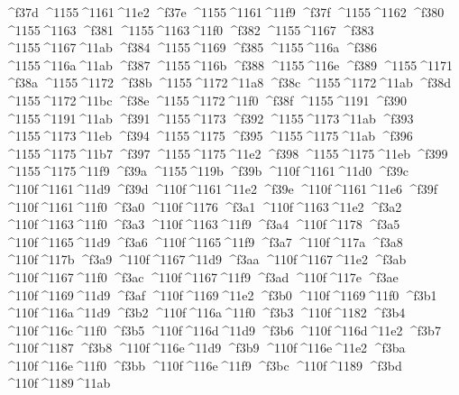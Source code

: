 \checkit ^^^^f37d ^^^^1155^^^^1161^^^^11e2
\checkit ^^^^f37e ^^^^1155^^^^1161^^^^11f9
\checkit ^^^^f37f ^^^^1155^^^^1162
\checkit ^^^^f380 ^^^^1155^^^^1163
\checkit ^^^^f381 ^^^^1155^^^^1163^^^^11f0
\checkit ^^^^f382 ^^^^1155^^^^1167
\checkit ^^^^f383 ^^^^1155^^^^1167^^^^11ab
\checkit ^^^^f384 ^^^^1155^^^^1169
\checkit ^^^^f385 ^^^^1155^^^^116a
\checkit ^^^^f386 ^^^^1155^^^^116a^^^^11ab
\checkit ^^^^f387 ^^^^1155^^^^116b
\checkit ^^^^f388 ^^^^1155^^^^116e
\checkit ^^^^f389 ^^^^1155^^^^1171
\checkit ^^^^f38a ^^^^1155^^^^1172
\checkit ^^^^f38b ^^^^1155^^^^1172^^^^11a8
\checkit ^^^^f38c ^^^^1155^^^^1172^^^^11ab
\checkit ^^^^f38d ^^^^1155^^^^1172^^^^11bc
\checkit ^^^^f38e ^^^^1155^^^^1172^^^^11f0
\checkit ^^^^f38f ^^^^1155^^^^1191
\checkit ^^^^f390 ^^^^1155^^^^1191^^^^11ab
\checkit ^^^^f391 ^^^^1155^^^^1173
\checkit ^^^^f392 ^^^^1155^^^^1173^^^^11ab
\checkit ^^^^f393 ^^^^1155^^^^1173^^^^11eb
\checkit ^^^^f394 ^^^^1155^^^^1175
\checkit ^^^^f395 ^^^^1155^^^^1175^^^^11ab
\checkit ^^^^f396 ^^^^1155^^^^1175^^^^11b7
\checkit ^^^^f397 ^^^^1155^^^^1175^^^^11e2
\checkit ^^^^f398 ^^^^1155^^^^1175^^^^11eb
\checkit ^^^^f399 ^^^^1155^^^^1175^^^^11f9
\checkit ^^^^f39a ^^^^1155^^^^119b
\checkit ^^^^f39b ^^^^110f^^^^1161^^^^11d0
\checkit ^^^^f39c ^^^^110f^^^^1161^^^^11d9
\checkit ^^^^f39d ^^^^110f^^^^1161^^^^11e2
\checkit ^^^^f39e ^^^^110f^^^^1161^^^^11e6
\checkit ^^^^f39f ^^^^110f^^^^1161^^^^11f0
\checkit ^^^^f3a0 ^^^^110f^^^^1176
\checkit ^^^^f3a1 ^^^^110f^^^^1163^^^^11e2
\checkit ^^^^f3a2 ^^^^110f^^^^1163^^^^11f0
\checkit ^^^^f3a3 ^^^^110f^^^^1163^^^^11f9
\checkit ^^^^f3a4 ^^^^110f^^^^1178
\checkit ^^^^f3a5 ^^^^110f^^^^1165^^^^11d9
\checkit ^^^^f3a6 ^^^^110f^^^^1165^^^^11f9
\checkit ^^^^f3a7 ^^^^110f^^^^117a
\checkit ^^^^f3a8 ^^^^110f^^^^117b
\checkit ^^^^f3a9 ^^^^110f^^^^1167^^^^11d9
\checkit ^^^^f3aa ^^^^110f^^^^1167^^^^11e2
\checkit ^^^^f3ab ^^^^110f^^^^1167^^^^11f0
\checkit ^^^^f3ac ^^^^110f^^^^1167^^^^11f9
\checkit ^^^^f3ad ^^^^110f^^^^117e
\checkit ^^^^f3ae ^^^^110f^^^^1169^^^^11d9
\checkit ^^^^f3af ^^^^110f^^^^1169^^^^11e2
\checkit ^^^^f3b0 ^^^^110f^^^^1169^^^^11f0
\checkit ^^^^f3b1 ^^^^110f^^^^116a^^^^11d9
\checkit ^^^^f3b2 ^^^^110f^^^^116a^^^^11f0
\checkit ^^^^f3b3 ^^^^110f^^^^1182
\checkit ^^^^f3b4 ^^^^110f^^^^116c^^^^11f0
\checkit ^^^^f3b5 ^^^^110f^^^^116d^^^^11d9
\checkit ^^^^f3b6 ^^^^110f^^^^116d^^^^11e2
\checkit ^^^^f3b7 ^^^^110f^^^^1187
\checkit ^^^^f3b8 ^^^^110f^^^^116e^^^^11d9
\checkit ^^^^f3b9 ^^^^110f^^^^116e^^^^11e2
\checkit ^^^^f3ba ^^^^110f^^^^116e^^^^11f0
\checkit ^^^^f3bb ^^^^110f^^^^116e^^^^11f9
\checkit ^^^^f3bc ^^^^110f^^^^1189
\checkit ^^^^f3bd ^^^^110f^^^^1189^^^^11ab
